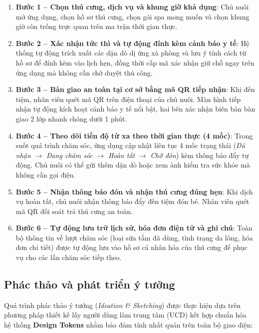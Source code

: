 \begin{enumerate}
    \item \textbf{Bước 1 -- Chọn thú cưng, dịch vụ và khung giờ khả dụng}: Chủ nuôi mở ứng dụng, chọn hồ sơ thú cưng, chọn gói spa mong muốn và chọn khung giờ còn trống trực quan trên ma trận thời gian thực.
    \item \textbf{Bước 2 -- Xác nhận tức thì và tự động đính kèm cảnh báo y tế}: Hệ thống tự động trích xuất các dặn dò dị ứng xà phòng và lưu ý tính cách từ hồ sơ để đính kèm vào lịch hẹn, đồng thời cấp mã xác nhận giữ chỗ ngay trên ứng dụng mà không cần chờ duyệt thủ công.
    \item \textbf{Bước 3 -- Bàn giao an toàn tại cơ sở bằng mã QR tiếp nhận}: Khi đến tiệm, nhân viên quét mã QR trên điện thoại của chủ nuôi. Màn hình tiếp nhận tự động kích hoạt cảnh báo y tế nổi bật, hai bên xác nhận biên bản bàn giao 2 lớp nhanh chóng dưới 1 phút.
    \item \textbf{Bước 4 -- Theo dõi tiến độ từ xa theo thời gian thực (4 mốc)}: Trong suốt quá trình chăm sóc, ứng dụng cập nhật liên tục 4 mốc trạng thái (\textit{Đã nhận} $\rightarrow$ \textit{Đang chăm sóc} $\rightarrow$ \textit{Hoàn tất} $\rightarrow$ \textit{Chờ đón}) kèm thông báo đẩy tự động. Chủ nuôi có thể gửi thêm dặn dò hoặc xem ảnh kiểm tra sức khỏe mà không cần gọi điện.
    \item \textbf{Bước 5 -- Nhận thông báo đón và nhận thú cưng đúng hẹn}: Khi dịch vụ hoàn tất, chủ nuôi nhận thông báo đẩy đến tiệm đón bé. Nhân viên quét mã QR đối soát trả thú cưng an toàn.
    \item \textbf{Bước 6 -- Tự động lưu trữ lịch sử, hóa đơn điện tử và ghi chú}: Toàn bộ thông tin về lượt chăm sóc (loại sữa tắm đã dùng, tình trạng da lông, hóa đơn chi tiết) được tự động lưu vào hồ sơ cá nhân hóa của thú cưng để phục vụ cho các lần chăm sóc tiếp theo.
\end{enumerate}

\subsection{Phác thảo và phát triển ý tưởng}
Quá trình phác thảo ý tưởng (\textit{Ideation \& Sketching}) được thực hiện dựa trên phương pháp thiết kế lấy người dùng làm trung tâm (UCD) kết hợp chuẩn hóa hệ thống \textbf{Design Tokens} nhằm bảo đảm tính nhất quán trên toàn bộ giao diện:

